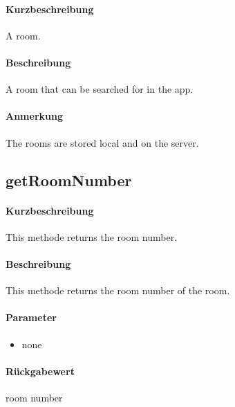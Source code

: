 \paragraph*{Kurzbeschreibung}
A room.
\paragraph*{Beschreibung}
A room that can be searched for in the app.
\paragraph*{Anmerkung}
The rooms are stored local and on the server.

\subsection{getRoomNumber}%
\paragraph*{Kurzbeschreibung}
This methode returns the room number.
\paragraph*{Beschreibung}
This methode returns the room number of the room.
\paragraph*{Parameter}
\begin{itemize}
    \item none
\end{itemize}
\paragraph*{Rückgabewert}
room number